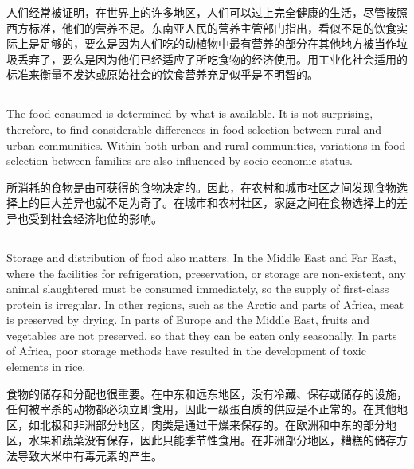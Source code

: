 \documentclass[]{article}
\begin{document}
人们经常被证明，在世界上的许多地区，人们可以过上完全健康的生活，尽管按照西方标准，他们的营养不足。东南亚人民的营养主管部门指出，看似不足的饮食实际上是足够的，要么是因为人们吃的动植物中最有营养的部分在其他地方被当作垃圾丢弃了，要么是因为他们已经适应了所吃食物的经济使用。用工业化社会适用的标准来衡量不发达或原始社会的饮食营养充足似乎是不明智的。

\subsection{}
\begin{spacing}{2.0}
	{\Large The food consumed is determined by what is available. It is not surprising, therefore, to find considerable differences in food selection between rural and urban communities. Within both urban and rural communities, variations in food selection between families are also influenced by socio-economic status.}\newline
\end{spacing}

所消耗的食物是由可获得的食物决定的。因此，在农村和城市社区之间发现食物选择上的巨大差异也就不足为奇了。在城市和农村社区，家庭之间在食物选择上的差异也受到社会经济地位的影响。

\subsection{}
\begin{spacing}{2.0}
	{\Large Storage and distribution of food also matters. In the Middle East and Far East,	where the facilities for refrigeration, preservation, or storage are non-existent, any animal slaughtered must be consumed immediately, so the supply of first-class protein is irregular. In other regions, such as the Arctic and parts of Africa, meat is preserved by drying. In parts of Europe and the Middle East, fruits and vegetables are not preserved, so that they can be eaten only seasonally. In parts of Africa, poor storage methods have resulted in the development of toxic elements in rice.}\newline
\end{spacing}

食物的储存和分配也很重要。在中东和远东地区，没有冷藏、保存或储存的设施，任何被宰杀的动物都必须立即食用，因此一级蛋白质的供应是不正常的。在其他地区，如北极和非洲部分地区，肉类是通过干燥来保存的。在欧洲和中东的部分地区，水果和蔬菜没有保存，因此只能季节性食用。在非洲部分地区，糟糕的储存方法导致大米中有毒元素的产生。
\end{document}
